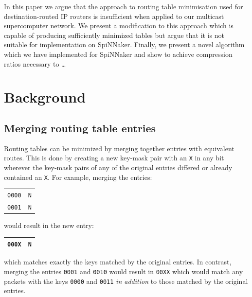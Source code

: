 \documentclass[conference]{IEEEtran}
\newcommand{\mytt}[1]{\texttt{\footnotesize#1}}
\begin{document}
In this paper we argue that the approach to routing table minimisation used for destination-routed IP routers is insufficient when applied to our multicast supercomputer network.
We present a modification to this approach which is capable of producing sufficiently minimized tables but argue that it is not suitable for implementation on SpiNNaker.
Finally, we present a novel algorithm which we have implemented for SpiNNaker and show to achieve compression ratios necessary to \ldots


\section{Background}

  \subsection{Merging routing table entries}

  Routing tables can be minimized by merging together entries with equivalent routes.
  This is done by creating a new key-mask pair with an \mytt{X} in any bit wherever the key-mask pairs of any of the original entries differed or already contained an \mytt{X}.
  For example, merging the entries:

  \begin{table}[H]
    \centering
    \begin{tabular}{c l}
      \toprule
      \texttt{0000} & \texttt{N}\\
      \texttt{0001} & \texttt{N}\\
      \bottomrule
    \end{tabular}
  \end{table}

  \noindent would result in the new entry:

  \begin{table}[H]
    \centering
    \begin{tabular}{c l}
      \toprule
      \texttt{000X} & \texttt{N}\\
      \bottomrule
    \end{tabular}
  \end{table}

  \noindent which matches exactly the keys matched by the original entries.
  In contrast, merging the entries \mytt{0001} and \mytt{0010} would result in \mytt{00XX} which would match any packets with the keys \mytt{0000} and \mytt{0011} \textit{in addition} to those matched by the original entries.
\end{document}
